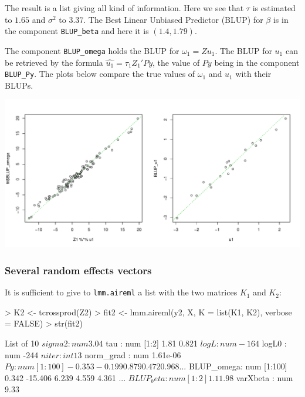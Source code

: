 \documentclass{article}
\renewenvironment{Schunk}{\vspace{\topsep}}{\vspace{\topsep}}
\begin{document}
  The result is a list giving all kind of information. Here we see that $\tau$ is 
  estimated to $1.65$ and $\sigma^2$ to $3.37$. 
  The Best Linear Unbiased Predictor (BLUP) for $\beta$ is in the component \verb!BLUP_beta!
  and here it is $(1.4, 1.79)$.
  
  The component \verb!BLUP_omega! holds the BLUP for $\omega_1 = Z u_1$. The BLUP for $u_1$
  can be retrieved by the formula $\widehat{u_1} = \tau_1 Z_1' P y$, the value of $Py$ being
  in the component \verb!BLUP_Py!. The plots below compare the true values of $\omega_1$ and
  $u_1$ with their BLUPs.
   
\begin{center}
\begin{Schunk}
\end{Schunk}
\includegraphics{gaston-043}
\end{center}

  \subsubsection{Several random effects vectors}

  It is sufficient to give to \verb!lmm.aireml! a list with the two matrices
  $K_1$ and $K_2$:

\begin{Schunk}
\begin{Sinput}
> K2 <- tcrossprod(Z2)
> fit2 <- lmm.aireml(y2, X, K = list(K1, K2), verbose = FALSE)
> str(fit2)
\end{Sinput}
\begin{Soutput}
List of 10
 $ sigma2    : num 3.04
 $ tau       : num [1:2] 1.81 0.821
 $ logL      : num -164
 $ logL0     : num -244
 $ niter     : int 13
 $ norm_grad : num 1.61e-06
 $ Py        : num [1:100] -0.353 -0.199 0.879 0.472 0.968 ...
 $ BLUP_omega: num [1:100] 0.342 -15.406 6.239 4.559 4.361 ...
 $ BLUP_beta : num [1:2] 1.1 1.98
 $ varXbeta  : num 9.33
\end{Soutput}
\end{Schunk}
\end{document}
